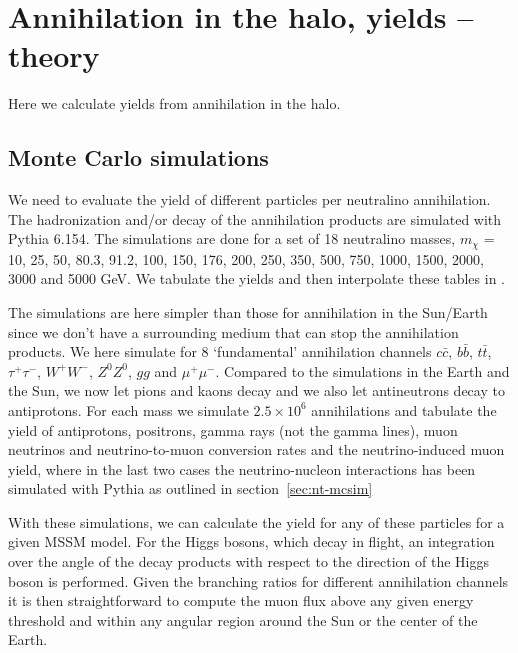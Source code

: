 \section{Annihilation in the halo, yields -- theory}

Here we calculate yields from annihilation in the halo.

\subsection{Monte Carlo simulations}
\label{sec:ha-mcsim}

We need to
evaluate the yield of different particles per neutralino annihilation.
The hadronization and/or decay of the annihilation products are
simulated with {\sc Pythia} \cite{pythia} 6.154.
The simulations are done for a set of 18 neutralino
masses, $m_{\chi}$ = 10, 25, 50, 80.3, 91.2, 100, 150, 176, 200, 250,
350, 500, 750, 1000, 1500, 2000, 3000 and 5000 GeV\@. We tabulate the
yields and then interpolate these tables in \ds.

     The simulations are here
     simpler than those for annihilation in the Sun/Earth
    since we don't have a surrounding medium that can stop the
     annihilation products.  We here simulate for 8 `fundamental'
     annihilation channels $c\bar{c}$, $b\bar{b}$,
     $t\bar{t}$, $\tau^+\tau^-$, $W^+W^-$, $Z^0 Z^{0}$, $g g$ and
     $\mu^{+} \mu^{-}$. Compared to the simulations in the Earth and
     the Sun, we now let pions and kaons decay and we also let
     antineutrons decay to antiprotons. For each mass we simulate
     $2.5 \times 10^{6}$ annihilations and tabulate the yield of
     antiprotons, positrons, gamma rays (not the gamma lines),
     muon neutrinos and neutrino-to-muon conversion rates and the
     neutrino-induced muon yield, where in the last two cases the
     neutrino-nucleon interactions has been simulated with {\sc
     Pythia} as outlined in section~\ref{sec:nt-mcsim}

With these simulations, we can calculate the yield for any of these
particles for a given MSSM model.  For the Higgs bosons, which decay
in flight, an integration over the angle of the decay products with
respect to the direction of the Higgs boson is performed.  Given the
branching ratios for different annihilation channels it is then
straightforward to compute the muon flux above any given energy
threshold and within any angular region around the Sun or the center
of the Earth.
